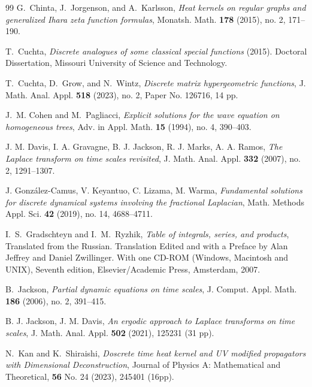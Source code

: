 \documentclass[12pt]{amsart}
\numberwithin{equation}{section}
\begin{document}
\begin{thebibliography}{99}
 G.~Chinta, J.~Jorgenson, and A.~Karlsson, \emph{Heat kernels
on regular graphs and generalized Ihara zeta function formulas}, Monatsh.
Math. \textbf{178} (2015), no. 2, 171--190.

 T.~Cuchta, \emph{Discrete analogues of some classical special
functions} (2015). Doctoral Dissertation, Missouri University of Science and
Technology.

 T.~Cuchta, D.~Grow, and N.~Wintz, \emph{Discrete matrix
hypergeometric functions}, J. Math. Anal. Appl. \textbf{518} (2023), no. 2,
Paper No. 126716, 14 pp.

 J.~M. Cohen and M.~Pagliacci, \emph{Explicit solutions for
the wave equation on homogeneous trees}, Adv. in Appl. Math. \textbf{15}
(1994), no. 4, 390--403.


 J. M. Davis, I. A. Gravagne, B. J. Jackson, R. J. Marks, A. A. Ramos, \emph{The Laplace transform on time scales revisited}, J. Math. Anal. Appl. \textbf{332} (2007), no. 2, 1291--1307.

 J. Gonz\' alez-Camus, V. Keyantuo, C. Lizama, M. Warma, \emph{Fundamental solutions for discrete dynamical systems involving the fractional Laplacian}, Math. Methods Appl. Sci. \textbf{42} (2019), no. 14, 4688--4711.

 I.~S.~Gradschteyn and I.~M.~Ryzhik, \emph{Table of integrals,
series, and products}, Translated from the Russian. Translation Edited and
with a Preface by Alan Jeffrey and Daniel Zwillinger. With one CD-ROM
(Windows, Macintosh and UNIX), Seventh edition, Elsevier/Academic Press,
Amsterdam, 2007.

 B.~Jackson, \emph{Partial dynamic equations on time scales},
J. Comput. Appl. Math. \textbf{186} (2006), no. 2, 391--415.

 B. J. Jackson, J. M. Davis, \emph{An ergodic approach to Laplace transforms on time scales},
J. Math. Anal. Appl. \textbf{502} (2021), 125231 (31 pp).

 N.~Kan and K.~Shiraishi, \emph{Doscrete time heat kernel and
UV modified propagators with Dimensional Deconstruction}, Journal of Physics A: Mathematical and Theoretical, \textbf{56}  No. 24 (2023), 245401 (16pp).



\end{thebibliography}
\end{document}
